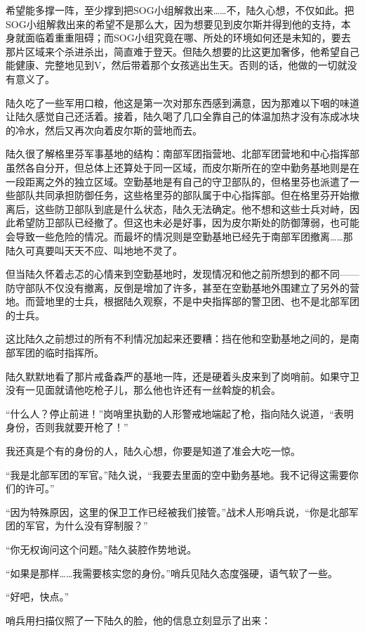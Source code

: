 希望能多撑一阵，至少撑到把SOG小组解救出来……不，陆久心想，不仅如此。把SOG小组解救出来的希望不是那么大，因为想要见到皮尔斯并得到他的支持，本身就面临着重重阻碍；而SOG小组究竟在哪、所处的环境如何还是未知的，要去那片区域来个杀进杀出，简直难于登天。但陆久想要的比这更加奢侈，他希望自己能健康、完整地见到V，然后带着那个女孩逃出生天。否则的话，他做的一切就没有意义了。

陆久吃了一些军用口粮，他这是第一次对那东西感到满意，因为那难以下咽的味道让陆久感觉自己还活着。接着，陆久喝了几口全靠自己的体温加热才没有冻成冰块的冷水，然后又再次向着皮尔斯的营地而去。

陆久很了解格里芬军事基地的结构：南部军团指营地、北部军团营地和中心指挥部虽然各自分开，但总体上还算处于同一区域，而皮尔斯所在的空中勤务基地则是在一段距离之外的独立区域。空勤基地是有自己的守卫部队的，但格里芬也派遣了一些部队共同承担防御任务，这些格里芬的部队属于中心指挥部。但在格里芬开始撤离后，这些防卫部队到底是什么状态，陆久无法确定。他不想和这些士兵对峙，因此希望防卫部队已经撤了。但这也未必是好事，因为皮尔斯处的防御薄弱，也可能会导致一些危险的情况。而最坏的情况则是空勤基地已经先于南部军团撤离……那陆久可真要叫天天不应、叫地地不灵了。

但当陆久怀着忐忑的心情来到空勤基地时，发现情况和他之前所想到的都不同——防守部队不仅没有撤离，反倒是增加了许多，甚至在空勤基地外围建立了另外的营地。而营地里的士兵，根据陆久观察，不是中央指挥部的警卫团、也不是北部军团的士兵。

这比陆久之前想过的所有不利情况加起来还要糟：挡在他和空勤基地之间的，是南部军团的临时指挥所。

陆久默默地看了那片戒备森严的基地一阵，还是硬着头皮来到了岗哨前。如果守卫没有一见面就请他吃枪子儿，那么他也许还有一丝斡旋的机会。

“什么人？停止前进！”岗哨里执勤的人形警戒地端起了枪，指向陆久说道，“表明身份，否则我就要开枪了！”

我还真是个有的身份的人，陆久心想，你要是知道了准会大吃一惊。

“我是北部军团的军官。”陆久说，“我要去里面的空中勤务基地。我不记得这需要你们的许可。”

“因为特殊原因，这里的保卫工作已经被我们接管。”战术人形哨兵说，“你是北部军团的军官，为什么没有穿制服？”

“你无权询问这个问题。”陆久装腔作势地说。

“如果是那样……我需要核实您的身份。”哨兵见陆久态度强硬，语气软了一些。

“好吧，快点。”

哨兵用扫描仪照了一下陆久的脸，他的信息立刻显示了出来：

